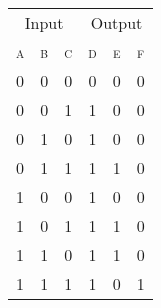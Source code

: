 \documentclass{standalone}
\begin{document}
	\begin{tabular}{ccc|ccc}
			\multicolumn{3}{c|}{Input} & \multicolumn{3}{c}{Output}\\
			\textsc{a} & \textsc{b} & \textsc{c} & \textsc{d} & \textsc{e} & \textsc{f} \\\hline
			0 & 0 & 0 & 0 & 0 & 0 \\
			0 & 0 & 1 & 1 & 0 & 0 \\
			0 & 1 & 0 & 1 & 0 & 0 \\
			0 & 1 & 1 & 1 & 1 & 0 \\
			1 & 0 & 0 & 1 & 0 & 0 \\
			1 & 0 & 1 & 1 & 1 & 0 \\
			1 & 1 & 0 & 1 & 1 & 0 \\
			1 & 1 & 1 & 1 & 0 & 1 \\
	\end{tabular}
\end{document}

